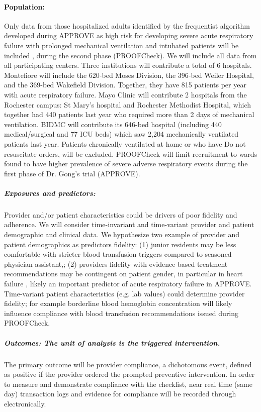 \documentclass[11pt,notitlepage]{article}
\begin{document}
\paragraph*{Population:} 
Only data from those hospitalized adults identified by the frequentist algorithm developed during APPROVE as high risk for developing severe acute respiratory failure with prolonged mechanical ventilation and intubated patients will be included , during the second phase (PROOFCheck). We will include all data from all participating centers. Three institutions will contribute a total of 6 hospitals. Montefiore will include the 620-bed Moses Division, the 396-bed Weiler Hospital, and the 369-bed Wakefield Division. Together, they have 815 patients per year with acute respiratory failure.  Mayo Clinic will contribute 2 hospitals from the Rochester campus: St Mary's hospital and Rochester Methodist Hospital, which together had 440 patients last year who required more than 2 days of mechanical ventilation.  BIDMC will contribute its 646-bed hospital (including 440 medical/surgical and 77 ICU beds) which saw 2,204 mechanically ventilated patients last year. Patients chronically ventilated at home or who have Do not resuscitate orders, will be excluded. PROOFCheck will limit recruitment to wards found to have higher prevalence of severe adverse respiratory events during the first phase of Dr. Gong's trial (APPROVE). 

\subparagraph*{Exposures and predictors:}
Provider and/or patient characteristics could be drivers of poor fidelity and adherence. We will consider time-invariant and time-variant provider and patient demographic and clinical data. We hypothesize two example of provider and patient demographics as predictors fidelity: (1) junior residents may be less comfortable with stricter blood transfusion triggers compared to seasoned physician assistant,; (2) providers fidelity with evidence based treatment recommendations may be contingent on patient gender, in particular in heart failure \cite{Cook_25714825}, likely an important predictor of acute respiratory failure in APPROVE. Time-variant patient characteristics (e.g. lab values) could determine provider fidelity; for example borderline blood hemoglobin concentration will likely influence compliance with blood transfusion recommendations issued during PROOFCheck. 

\subparagraph*{Outcomes: The unit of analysis is the triggered intervention.}
The primary outcome will be provider compliance, a dichotomous event, defined as positive if the provider ordered the prompted preventive intervention. In order to measure and demonstrate compliance with the checklist, near real time (same day) transaction logs and evidence for compliance will be recorded through electronically.
\end{document}
